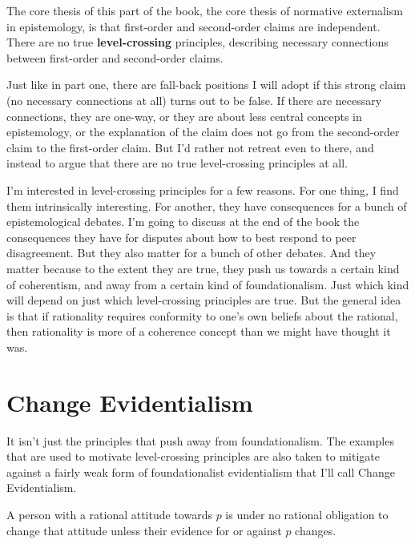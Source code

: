\documentclass[
  10pt,
  letterpaper,
  twoside]{scrbook}
\providecommand{\tightlist}{%
  \setlength{\itemsep}{0pt}\setlength{\parskip}{0pt}}\usepackage{longtable,booktabs,array}
\begin{document}
The core thesis of this part of the book, the core thesis of normative
externalism in epistemology, is that first-order and second-order claims
are independent. There are no true \textbf{level-crossing} principles,
describing necessary connections between first-order and second-order
claims.

Just like in part one, there are fall-back positions I will adopt if
this strong claim (no necessary connections at all) turns out to be
false. If there are necessary connections, they are one-way, or they are
about less central concepts in epistemology, or the explanation of the
claim does not go from the second-order claim to the first-order claim.
But I'd rather not retreat even to there, and instead to argue that
there are no true level-crossing principles at all.

I'm interested in level-crossing principles for a few reasons. For one
thing, I find them intrinsically interesting. For another, they have
consequences for a bunch of epistemological debates. I'm going to
discuss at the end of the book the consequences they have for disputes
about how to best respond to peer disagreement. But they also matter for
a bunch of other debates. And they matter because to the extent they are
true, they push us towards a certain kind of coherentism, and away from
a certain kind of foundationalism. Just which kind will depend on just
which level-crossing principles are true. But the general idea is that
if rationality requires conformity to one's own beliefs about the
rational, then rationality is more of a coherence concept than we might
have thought it was.

\section{Change Evidentialism}\label{changeevidentialism}

It isn't just the principles that push away from foundationalism. The
examples that are used to motivate level-crossing principles are also
taken to mitigate against a fairly weak form of foundationalist
evidentialism that I'll call Change Evidentialism.

\begin{description}
\tightlist
\item[Change Evidentialism]
A person with a rational attitude towards \(p\) is under no rational
obligation to change that attitude unless their evidence for or against
\(p\) changes.
\end{description}
\end{document}
